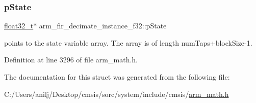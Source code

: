 \subsubsection{\texorpdfstring{p\+State}{pState}}
{\footnotesize\ttfamily \hyperlink{arm__math_8h_a4611b605e45ab401f02cab15c5e38715}{float32\+\_\+t}$\ast$ arm\+\_\+fir\+\_\+decimate\+\_\+instance\+\_\+f32\+::p\+State}

points to the state variable array. The array is of length num\+Taps+block\+Size-\/1. 

Definition at line 3296 of file arm\+\_\+math.\+h.



The documentation for this struct was generated from the following file\+:\begin{DoxyCompactItemize}
\item 
C\+:/\+Users/anilj/\+Desktop/cmsis/sorc/system/include/cmsis/\hyperlink{arm__math_8h}{arm\+\_\+math.\+h}\end{DoxyCompactItemize}
